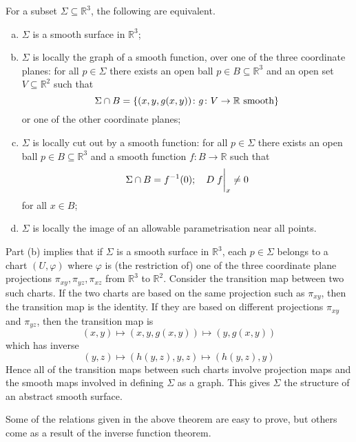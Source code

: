 \begin{theorem}
	For a subset \( \Sigma \subseteq \mathbb R^3 \), the following are equivalent.
	\begin{enumerate}[(a)]
		\item \( \Sigma \) is a smooth surface in \( \mathbb R^3 \);
		\item \( \Sigma \) is locally the graph of a smooth function, over one of the three coordinate planes: for all \( p \in \Sigma \) there exists an open ball \( p \in B \subseteq \mathbb R^3 \) and an open set \( V \subseteq \mathbb R^2 \) such that
		      \[
			      \Sigma \cap B = \qty{(x, y, g(x,y)) \colon g \colon V \to \mathbb R \text{ smooth}}
		      \]
		      or one of the other coordinate planes;
		\item \( \Sigma \) is locally cut out by a smooth function: for all \( p \in \Sigma \) there exists an open ball \( p \in B \subseteq \mathbb R^3 \) and a smooth function \( f \colon B \to \mathbb R \) such that
		      \[
			      \Sigma \cap B = f^{-1}(0);\quad D \eval{f}_x \neq 0
		      \]
		      for all \( x \in B \);
		\item \( \Sigma \) is locally the image of an allowable parametrisation near all points.
	\end{enumerate}
\end{theorem}
\begin{remark}
	Part (b) implies that if \( \Sigma \) is a smooth surface in \( \mathbb R^3 \), each \( p \in \Sigma \) belongs to a chart \( (U, \varphi) \) where \( \varphi \) is (the restriction of) one of the three coordinate plane projections \( \pi_{xy}, \pi_{yz}, \pi_{xz} \) from \( \mathbb R^3 \) to \( \mathbb R^2 \).
	Consider the transition map between two such charts.
	If the two charts are based on the same projection such as \( \pi_{xy} \), then the transition map is the identity.
	If they are based on different projections \( \pi_{xy} \) and \( \pi_{yz} \), then the transition map is
	\[
		(x,y) \mapsto (x,y,g(x,y)) \mapsto (y,g(x,y))
	\]
	which has inverse
	\[
		(y,z) \mapsto (h(y,z),y,z) \mapsto (h(y,z),y)
	\]
	Hence all of the transition maps between such charts involve projection maps and the smooth maps involved in defining \( \Sigma \) as a graph.
	This gives \( \Sigma \) the structure of an abstract smooth surface.
\end{remark}
Some of the relations given in the above theorem are easy to prove, but others come as a result of the inverse function theorem.

